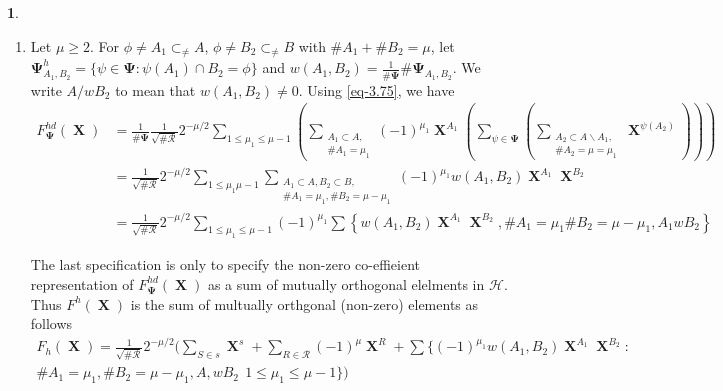 \documentclass[a4paper,12pt]{article}
\DeclareMathOperator{\x}{\mathrm{X}}
\theoremstyle{definition}
\theoremstyle{underlinethm}
\theoremstyle{definition}
\newtheorem{subsubsec}{}[subsection]
\begin{document}
\begin{subsubsec}
\begin{enumerate}[label=(\alph*)]
\item Let $\mu\geq 2$. For $\phi \neq A_{1} \subset_{\neq} A$, $\phi \neq B_{2} \subset_{\neq}B$ with $\# A_{1} + \# B_{2}= \mu$, let $\boldsymbol{\Psi}_{A_{1}, B_{2}}^{h} = \{\psi \in \boldsymbol{\Psi} : \psi(A_{1})\cap B_{2} = \phi\}$ and $w(A_{1}, B_{2}) = \frac{1}{\# \boldsymbol{\Psi}} \# \boldsymbol{\Psi}_{A_{1}, B_{2}}$. We write $A/wB_{2}$ to mean that $w(A_{1}, B_{2}) \neq 0$. Using \eqref{eq-3.75}, we have
{\fontsize{10}{12}\selectfont
\begin{align*}
F_{\boldsymbol{\Psi}}^{hd} (\boldsymbol{\x}) &= \frac{1}{\# \boldsymbol{\Psi}} \frac{1}{\sqrt{\#\mathcal{R}}} 2^{-\mu/2} \sum_{1 \leq \mu_{1} \leq \mu-1} \left(\sum_{\substack{A_{1}\subset A,\\\# A_{1}=\mu_{1}}} (-1)^{\mu_{1}} \boldsymbol{\x}^{A_{1}}\left( \sum_{\psi \in \boldsymbol{\Psi}} \left( \sum_{\substack{A_{2} \subset A \smallsetminus A_{1},\\ \# A_{2} = \mu=\mu_{1}}} \boldsymbol{\x}^{\psi(A_{2})}\right) \right) \right)\\
& = \frac{1}{\sqrt{\#\mathcal{R}}} 2^{-\mu/2} \sum_{1 \leq \mu_{1} \mu-1} \sum_{\substack{A_{1}\subset A, B_{2}\subset B, \\ \# A_{1}=\mu_{1}, \# B_{2}= \mu-\mu_{1}}} (-1)^{\mu_{1}} w(A_{1}, B_{2}) \boldsymbol{\x}^{A_{1}} \boldsymbol{\x}^{B_{2}}\\
& = \frac{1}{\sqrt{\# \mathcal{R}}} 2^{-\mu/2} \sum_{1 \leq \mu_{1} \leq \mu-1} (-1)^{\mu_{1}} \sum \left\{w(A_{1}, B_{2})\boldsymbol{\x}^{A_{1}} \boldsymbol{\x}^{B_{2}}, \# A_{1} =\mu_{1} \# B_{2} = \mu-\mu_{1}, A_{1} w B_{2}\right\}\tag{3.78}\label{eq-3.78}
\end{align*}} 

The last specification is only to specify the non-zero co-effieient representation of $F_{\boldsymbol{\Psi}}^{hd}(\boldsymbol{\x})$ as a sum of mutually orthogonal elelments in $\mathcal{H}$. Thus $F^{h}(\boldsymbol{\x})$ is the sum of multually orthgonal (non-zero) elements as follows 
\begin{equation}
\begin{multlined}
F_{h}(\boldsymbol{\x}) = \frac{1}{\sqrt{\# \mathcal{R}}} 2^{-\mu/2} \Bigg(\sum_{S \in s} \boldsymbol{\x}^{s} + \sum_{R \in \mathcal{R}} (-1)^{\mu} \boldsymbol{\x}^{R}  + \sum \Big\{(-1)^{\mu_{1}} w(A_{1}, B_{2}) \boldsymbol{\x}^{A_{1}} \boldsymbol{\x}^{B_{2}} :\\ \# A_{1} = \mu_{1}, \# B_{2} = \mu-\mu_{1}, A, wB_{2}~~ 1 \leq \mu_{1} \leq \mu-1 \Big\}\Bigg)\tag{3.79}\label{eq-3.79}
\end{multlined}
\end{equation} 
 

\end{enumerate}
\end{subsubsec}
\end{document}
